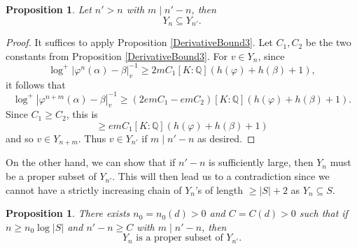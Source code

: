 \documentclass[10pt, reqno]{amsart}
\newcommand{\bb}{\mathbb}
\newcommand{\vphi}{\varphi}
\numberwithin{theorem}{section}
\newtheorem{proposition}[theorem]{Proposition}
\numberwithin{equation}{section}
\numberwithin{example}{section}
\numberwithin{definition}{section}
\begin{document}
\begin{proposition} \label{SuperAttractingBound2}
Let $n' > n$ with $m \mid n' - n$, then 
$$Y_{n} \subseteq Y_{n'}.$$
\end{proposition}

\begin{proof}
It suffices to apply Proposition \ref{DerivativeBound3}. Let $C_1,C_2$ be the two constants from Proposition \ref{DerivativeBound3}. For $v \in Y_n$, since 
$$\log^+|\vphi^n(\alpha)-\beta|^{-1}_v \geq 2m C_1 [K:\bb{Q}](h(\vphi)+ h(\beta)+1),$$
it follows that 
$$\log^+|\vphi^{n+m}(\alpha) - \beta|_v^{-1} \geq (2emC_1 - emC_2)[K:\bb{Q}](h(\vphi)+h(\beta)+1).$$
Since $C_1 \geq C_2$, this is 
$$\geq emC_1[K:\bb{Q}](h(\vphi) + h(\beta)+1)$$
and so $v \in Y_{n+m}$. Thus $v \in Y_{n'}$ if $m \mid n' - n$ as desired.
\end{proof}

On the other hand, we can show that if $n' - n$ is sufficiently large, then $Y_n$ must be a proper subset of $Y_{n'}$. This will then lead us to a contradiction since we cannot have a strictly increasing chain of $Y_n$'s of length $\geq |S|+2$ as $Y_n \subseteq S$. 

\begin{proposition} \label{SuperAttractingBound3}
There exists $n_0 = n_0(d) > 0$ and $C = C(d) > 0$ such that if $n \geq n_0 \log |S|$ and $n' - n \geq C$ with $m \mid n'-n$, then
$$Y_{n} \text{ is a proper subset of } Y_{n'}.$$
\end{proposition}
\end{document}
